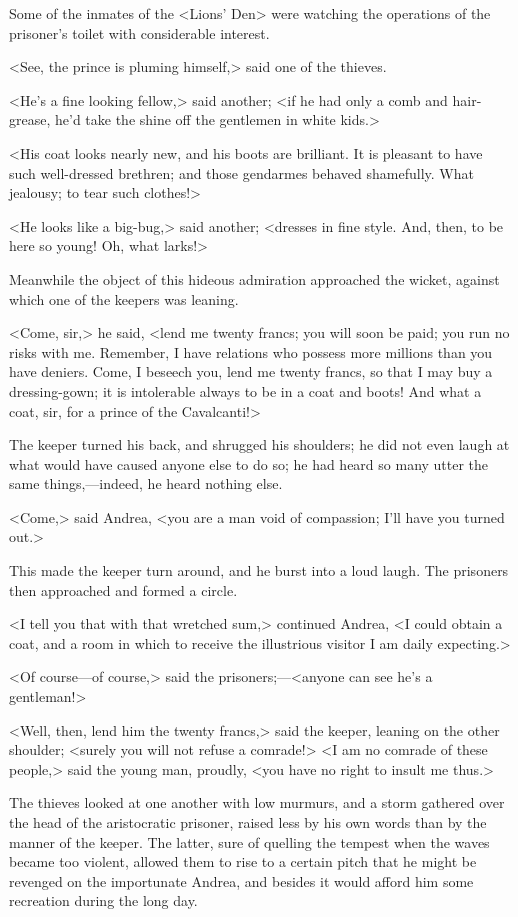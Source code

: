  Some of the inmates of the <Lions' Den> were watching the operations of the prisoner's toilet with considerable interest. 

 <See, the prince is pluming himself,> said one of the thieves. 

 <He's a fine looking fellow,> said another; <if he had only a comb and hair-grease, he'd take the shine off the gentlemen in white kids.> 

 <His coat looks nearly new, and his boots are brilliant. It is pleasant to have such well-dressed brethren; and those gendarmes behaved shamefully. What jealousy; to tear such clothes!> 

 <He looks like a big-bug,> said another; <dresses in fine style. And, then, to be here so young! Oh, what larks!> 

 Meanwhile the object of this hideous admiration approached the wicket, against which one of the keepers was leaning. 

 <Come, sir,> he said, <lend me twenty francs; you will soon be paid; you run no risks with me. Remember, I have relations who possess more millions than you have deniers. Come, I beseech you, lend me twenty francs, so that I may buy a dressing-gown; it is intolerable always to be in a coat and boots! And what a coat, sir, for a prince of the Cavalcanti!> 

 The keeper turned his back, and shrugged his shoulders; he did not even laugh at what would have caused anyone else to do so; he had heard so many utter the same things,—indeed, he heard nothing else. 

 <Come,> said Andrea, <you are a man void of compassion; I'll have you turned out.> 

 This made the keeper turn around, and he burst into a loud laugh. The prisoners then approached and formed a circle. 

 <I tell you that with that wretched sum,> continued Andrea, <I could obtain a coat, and a room in which to receive the illustrious visitor I am daily expecting.> 

 <Of course—of course,> said the prisoners;—<anyone can see he's a gentleman!> 

 <Well, then, lend him the twenty francs,> said the keeper, leaning on the other shoulder; <surely you will not refuse a comrade!>  <I am no comrade of these people,> said the young man, proudly, <you have no right to insult me thus.> 

 The thieves looked at one another with low murmurs, and a storm gathered over the head of the aristocratic prisoner, raised less by his own words than by the manner of the keeper. The latter, sure of quelling the tempest when the waves became too violent, allowed them to rise to a certain pitch that he might be revenged on the importunate Andrea, and besides it would afford him some recreation during the long day. 

